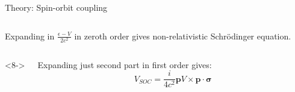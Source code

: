 \begin{frame}{Theory: Spin-orbit coupling}
\begin{columns}
\begin{column}{\linewidth}
			Expanding in $\frac{\epsilon - V}{2c^2}$ in zeroth order gives non-relativistic Schrödinger equation. 
		\end{column}
	\end{columns}
	\begin{columns}<8->
		\begin{column}{\linewidth}
			Expanding just second part in first order gives:
			\begin{equation*}
			V_{SOC} = \frac{i}{4c^2} \boldsymbol{p} V \times \boldsymbol{p} \cdot \boldsymbol{\sigma}
			\end{equation*}
		\end{column}
	\end{columns}
\end{frame}

